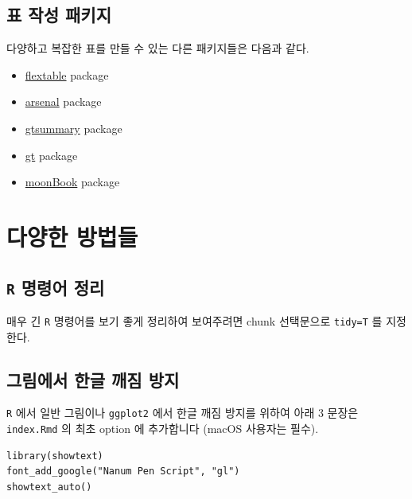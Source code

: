\documentclass[
]{book}
\providecommand{\tightlist}{%
  \setlength{\itemsep}{0pt}\setlength{\parskip}{0pt}}
\theoremstyle{definition}
\theoremstyle{definition}
\theoremstyle{definition}
\theoremstyle{definition}
\theoremstyle{remark}
\begin{document}
\hypertarget{uxd45c-uxc791uxc131-uxd328uxd0a4uxc9c0}{%
\section{표 작성 패키지}\label{uxd45c-uxc791uxc131-uxd328uxd0a4uxc9c0}}

다양하고 복잡한 표를 만들 수 있는 다른 패키지들은 다음과 같다.

\begin{itemize}
\tightlist
\item
  \href{https://davidgohel.github.io/flextable/index.html}{flextable} package
\item
  \href{https://mayoverse.github.io/arsenal/}{arsenal} package
\item
  \href{https://www.danieldsjoberg.com/gtsummary/index.html}{gtsummary} package
\item
  \href{https://gt.rstudio.com/}{gt} package
\item
  \href{https://github.com/cardiomoon/moonBook}{moonBook} package
\end{itemize}

\hypertarget{sometips}{%
\chapter{다양한 방법들}\label{sometips}}

\hypertarget{r-uxba85uxb839uxc5b4-uxc815uxb9ac}{%
\section{\texorpdfstring{\texttt{R} 명령어 정리}{R 명령어 정리}}\label{r-uxba85uxb839uxc5b4-uxc815uxb9ac}}

매우 긴 \texttt{R} 명령어를 보기 좋게 정리하여 보여주려면 chunk 선택문으로 \texttt{tidy=T} 를 지정한다.

\hypertarget{plothangul}{%
\section{그림에서 한글 깨짐 방지}\label{plothangul}}

\texttt{R} 에서 일반 그림이나 \texttt{ggplot2} 에서 한글 깨짐 방지를 위하여 아래 3 문장은 \texttt{index.Rmd} 의 최초 option 에 추가합니다 (macOS 사용자는 필수).

\begin{verbatim}
library(showtext)
font_add_google("Nanum Pen Script", "gl")
showtext_auto()
\end{verbatim}
\end{document}
